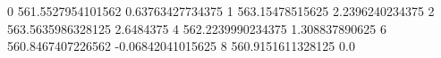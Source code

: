 0 561.5527954101562 0.63763427734375
1 563.15478515625 2.2396240234375
2 563.5635986328125 2.6484375
4 562.2239990234375 1.308837890625
6 560.8467407226562 -0.06842041015625
8 560.9151611328125 0.0
